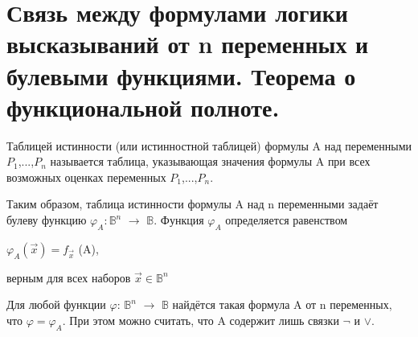 \section{Связь между формулами логики высказываний от n переменных и булевыми функциями. Теорема о функциональной полноте.}

\begin{definition}
Таблицей истинности (или истинностной таблицей) формулы A над переменными $P_1$,...,$P_n$ называется таблица,
указывающая значения формулы A при всех возможных оценках переменных $P_1$,...,$P_n$.

Таким образом, таблица истинности формулы A над n переменными задаёт булеву функцию $\varphi_A : \mathbb{B}^n$ $\to$ $\mathbb{B}$. Функция $\varphi_A$ определяется равенством
\begin{center}
$\varphi_A (\vec{x}) = f_{\vec{x}}$ (A),
\end{center}
верным для всех наборов $\vec{x} \in \mathbb{B}^n$
\end{definition}

\begin{theorem}
Для любой функции $\varphi$: $\mathbb{B}^n$ $\to$ $\mathbb{B}$ найдётся такая формула A от n переменных, что $\varphi = \varphi_A$. При этом можно считать, что A содержит лишь связки $\neg$ и $\lor$.
\end{theorem}


